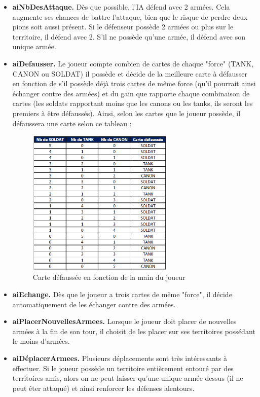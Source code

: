 \begin{itemize}
    \item \textbf{aiNbDesAttaque.}
    Dès que possible, l'IA défend avec 2 armées. Cela augmente ses chances de battre l'attaque, bien que le risque de perdre deux pions soit aussi présent. 
    Si le défenseur possède 2 armées ou plus sur le territoire, il défend avec 2. S'il ne possède qu'une armée, il défend avec son unique armée.
    \newline
    
    \item \textbf{aiDefausser.}
    Le joueur compte combien de cartes de chaque "force" (TANK, CANON ou SOLDAT) il possède et décide de la meilleure carte à défausser en fonction de s'il possède déjà trois cartes de même force (qu'il pourrait ainsi échanger contre des armées) et du gain que rapporte chaque combinaison de cartes (les soldats rapportant moins que les canons ou les tanks, ils seront les premiers à être défaussés). Ainsi, selon les cartes que le joueur possède, il défaussera une carte selon ce tableau :
    \begin{figure}[!htbp]
        \centering
        \includegraphics[width=7cm]{Images/defausse.png}
        \caption{Carte défaussée en fonction de la main du joueur}
        \label{fig:defausse}
    \end{figure}
    
    \item \textbf{aiEchange.}
    Dès que le joueur a trois cartes de même "force", il décide automatiquement de les échanger contre des armées.
    \newline
    
    \item \textbf{aiPlacerNouvellesArmees.}
    Lorsque le joueur doit placer de nouvelles armées à la fin de son tour, il choisit de les placer sur ses territoires possédant le moins d'armées.
    \newline
    
    \item \textbf{aiDéplacerArmees.}
    Plusieurs déplacements sont très intéressants à effectuer. Si le joueur possède un territoire entièrement entouré par des territoires amis, alors on ne peut laisser qu'une unique armée dessus (il ne peut êter attaqué) et ainsi renforcer les défenses alentours. 
\end{itemize}

